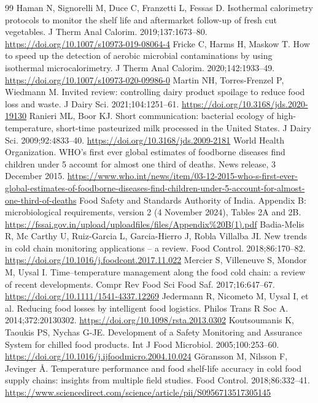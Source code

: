 {\begin{thebibliography}{99}
 Haman N, Signorelli M, Duce C, Franzetti L, Fessas D. Isothermal calorimetry protocols to monitor the shelf life and aftermarket follow-up of fresh cut vegetables. J Therm Anal Calorim. 2019;137:1673--80. \url{https://doi.org/10.1007/s10973-019-08064-4}
 Fricke C, Harms H, Maskow T. How to speed up the detection of aerobic microbial contaminations by using isothermal microcalorimetry. J Therm Anal Calorim. 2020;142:1933--49. \url{https://doi.org/10.1007/s10973-020-09986-0}
 Martin NH, Torres-Frenzel P, Wiedmann M. Invited review: controlling dairy product spoilage to reduce food loss and waste. J Dairy Sci. 2021;104:1251--61. \url{https://doi.org/10.3168/jds.2020-19130}
 Ranieri ML, Boor KJ. Short communication: bacterial ecology of high-temperature, short-time pasteurized milk processed in the United States. J Dairy Sci. 2009;92:4833--40. \url{https://doi.org/10.3168/jds.2009-2181}
 World Health Organization. WHO's first ever global estimates of foodborne diseases find children under 5 account for almost one third of deaths. News release, 3 December 2015. \url{https://www.who.int/news/item/03-12-2015-who-s-first-ever-global-estimates-of-foodborne-diseases-find-children-under-5-account-for-almost-one-third-of-deaths}
 Food Safety and Standards Authority of India. Appendix B: microbiological requirements, version 2 (4 November 2024), Tables 2A and 2B. \url{https://fssai.gov.in/upload/uploadfiles/files/Appendix%20B(1).pdf}
 Badia-Melis R, Mc Carthy U, Ruiz-Garcia L, Garcia-Hierro J, Robla Villalba JI. New trends in cold chain monitoring applications -- a review. Food Control. 2018;86:170--82. \url{https://doi.org/10.1016/j.foodcont.2017.11.022}
 Mercier S, Villeneuve S, Mondor M, Uysal I. Time--temperature management along the food cold chain: a review of recent developments. Compr Rev Food Sci Food Saf. 2017;16:647--67. \url{https://doi.org/10.1111/1541-4337.12269}
 Jedermann R, Nicometo M, Uysal I, et al. Reducing food losses by intelligent food logistics. Philos Trans R Soc A. 2014;372:20130302. \url{https://doi.org/10.1098/rsta.2013.0302}
 Koutsoumanis K, Taoukis PS, Nychas G-JE. Development of a Safety Monitoring and Assurance System for chilled food products. Int J Food Microbiol. 2005;100:253--60. \url{https://doi.org/10.1016/j.ijfoodmicro.2004.10.024}
 Göransson M, Nilsson F, Jevinger Å. Temperature performance and food shelf-life accuracy in cold food supply chains: insights from multiple field studies. Food Control. 2018;86:332--41. \url{https://www.sciencedirect.com/science/article/pii/S0956713517305145}

\end{thebibliography}}
